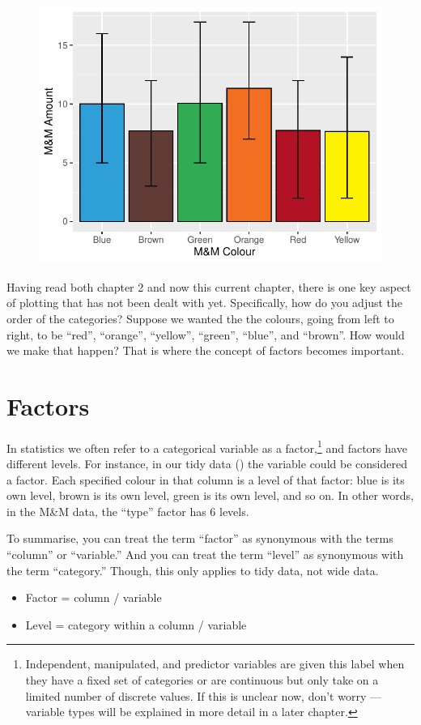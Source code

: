 \begin{figure}[H]
\includegraphics[scale = .75]{graphics/ch3Figs/bar_4.pdf}
\end{figure}

Having read both chapter 2 and now this current chapter, there is one key aspect of plotting that has not been dealt with yet. Specifically, how do you adjust the order of the categories? Suppose we wanted the the colours, going from left to right, to be ``red'', ``orange'', ``yellow'', ``green'', ``blue'', and ``brown''. How would we make that happen? That is where the concept of factors becomes important.

\section{Factors}

In statistics we often refer to a categorical variable as a \gls{factor},\footnote{Independent, manipulated, and predictor variables are given this label when they have a fixed set of categories or are continuous but only take on a limited number of discrete values. If this is unclear now, don't worry — variable types will be explained in more detail in a later chapter.} and factors have different \glspl{level}.  For instance, in our tidy data () the variable  could be considered a factor. Each specified colour in that column is a level of that factor: blue is its own  level, brown is its own level, green is its own level, and so on. In other words, in the M\&M data, the ``type'' factor has 6 levels.

To summarise, you can treat the term ``factor'' as synonymous with the terms ``column'' or ``variable.'' And you can treat the term ``level'' as synonymous with the term ``category.'' Though, this only applies to tidy data, not wide data.
{
\begin{itemize}
  \setlength\itemsep{-1em}
    \item Factor = column / variable
    \item Level = category within a column / variable
\end{itemize}
}

